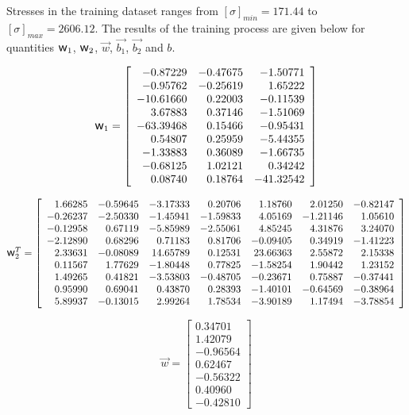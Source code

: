 \documentclass[final,5p,times,twocolumn]{elsarticle}
\newcommand{\w}{\mbox{\large\ensuremath{\mathsf{w}}}}
\begin{document}
Stresses in the training dataset ranges from $[\sigma]_{min}=171.44$ to $[\sigma]_{max}=2606.12$.
The results of the training process are given below for quantities $\w_1$, $\w_2$, $\overrightarrow{w}$, $\overrightarrow{b_1}$, $\overrightarrow{b_2}$ and $b$.

\begin{equation*}
\w_1=\left[
\begin{array}{rrr}
 -0.87229 & -0.47675 & -1.50771\\
 -0.95762 & -0.25619 &  1.65222\\
 -10.61660 &  0.22003 & -0.11539\\
  3.67883 &  0.37146 & -1.51069\\
 -63.39468 &  0.15466 & -0.95431\\
  0.54807 &  0.25959 & -5.44355\\
 -1.33883 &  0.36089 & -1.66735\\
 -0.68125 &  1.02121 &  0.34242\\
  0.08740 &  0.18764 & -41.32542
\end{array}\right]
\end{equation*}

\begin{equation*}
\w_2^T=\left[
\begin{array}{rrrrrrrrr}
  1.66285 & -0.59645 & -3.17333 &  0.20706 &  1.18760 &  2.01250 & -0.82147\\
 -0.26237 & -2.50330 & -1.45941 & -1.59833 &  4.05169 & -1.21146 &  1.05610\\
 -0.12958 &  0.67119 & -5.85989 & -2.55061 &  4.85245 &  4.31876 &  3.24070\\
 -2.12890 &  0.68296 &  0.71183 &  0.81706 & -0.09405 &  0.34919 & -1.41223\\
  2.33631 & -0.08089 &  14.65789 &  0.12531 &  23.66363 &  2.55872 &  2.15338\\
  0.11567 &  1.77629 & -1.80448 &  0.77825 & -1.58254 &  1.90442 &  1.23152\\
  1.49265 &  0.41821 & -3.53803 & -0.48705 & -0.23671 &  0.75887 & -0.37441\\
  0.95990 &  0.69041 &  0.43870 &  0.28393 & -1.40101 & -0.64569 & -0.38964\\
  5.89937 & -0.13015 &  2.99264 &  1.78534 & -3.90189 &  1.17494 & -3.78854
\end{array}\right]
\end{equation*}

\begin{equation*}
\overrightarrow{w}=\left[
\begin{array}{r}
  0.34701\\
  1.42079\\
 -0.96564\\
  0.62467\\
 -0.56322\\
  0.40960\\
 -0.42810
\end{array}\right]
\end{equation*}
\end{document}
